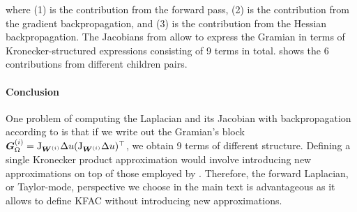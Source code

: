 where (1) is the contribution from the forward pass, (2) is the contribution from the gradient backpropagation, and (3) is the contribution from the Hessian backpropagation. The Jacobians from  allow to express the Gramian in terms of Kronecker-structured expressions consisting of 9 terms in total.  shows the 6 contributions from different children pairs.

\paragraph{Conclusion} One problem of computing the Laplacian and its Jacobian with backpropagation according to  is that if we write out the Gramian's block ${\bm{G}}_{\Omega}^{(i)} = \mathrm{J}_{{\bm{W}}^{(i)}} \Delta u (\mathrm{J}_{{\bm{W}}^{(i)}} \Delta u)^{\top}$, we obtain 9 terms of different structure.
Defining a single Kronecker product approximation would involve introducing new approximations on top of those employed by \citet{eschenhagen2023kroneckerfactored}.
Therefore, the forward Laplacian, or Taylor-mode, perspective we choose in the main text is advantageous as it allows to define KFAC without introducing new approximations.


